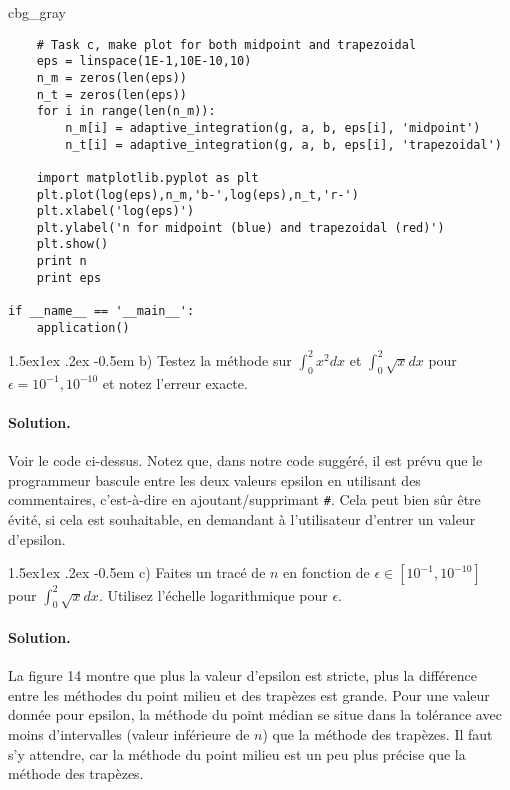 \documentclass[%
oneside,                 %
final,                   %
10pt,french]{article}
\makeatletter
\newenvironment{_cod_tight}[1]{
   \def\FrameCommand{\colorbox{#1}}
   \FrameRule0.6pt\MakeFramed {\FrameRestore}\vskip3mm}
   {\vskip0mm\endMakeFramed}
\newenvironment{cod}[1]{
\bgroup\rmfamily
\fboxsep=0mm\relax
\begin{_cod_tight}{#1}
\list{}{\parsep=-2mm\parskip=0mm\topsep=0pt\leftmargin=2mm
\rightmargin=2\leftmargin\leftmargin=4pt\relax}
\item\relax}
{\endlist\end{_cod_tight}\egroup}
\newenvironment{doconceexercise}{}{}
\newcommand\subex{\@startsection{paragraph}{4}{\z@}%
                  {1.5ex\@plus1ex \@minus.2ex}%
                  {-0.5em}%
                  {\normalfont\normalsize\bfseries}}
\makeatother
\begin{document}
\begin{doconceexercise}
\begin{cod}{cbg_gray}
\begin{verbatim}
    # Task c, make plot for both midpoint and trapezoidal
    eps = linspace(1E-1,10E-10,10)
    n_m = zeros(len(eps))
    n_t = zeros(len(eps))
    for i in range(len(n_m)):
        n_m[i] = adaptive_integration(g, a, b, eps[i], 'midpoint')
        n_t[i] = adaptive_integration(g, a, b, eps[i], 'trapezoidal')

    import matplotlib.pyplot as plt
    plt.plot(log(eps),n_m,'b-',log(eps),n_t,'r-')
    plt.xlabel('log(eps)')
    plt.ylabel('n for midpoint (blue) and trapezoidal (red)')
    plt.show()
    print n
    print eps

if __name__ == '__main__':
    application()

\end{verbatim}
\end{cod}
\noindent


\subex{b)}
Testez la méthode sur $\int_0^2x^2dx$ et $\int_0^2\sqrt{x}dx$ pour $\epsilon = 10^{−1},10^{−10}$ et notez l'erreur exacte.


\paragraph{Solution.}
Voir le code ci-dessus. Notez que, dans notre code suggéré, il est prévu que le programmeur bascule entre les deux valeurs epsilon en utilisant des commentaires, c'est-à-dire en ajoutant/supprimant \Verb!#!. Cela peut bien sûr être évité, si cela est souhaitable, en demandant à l'utilisateur d'entrer un valeur d'epsilon.


\subex{c)}
Faites un tracé de $n$ en fonction de $\epsilon \in [10^{-1}, 10^{-10}]$ pour $\int_0^2\sqrt{x}dx$. Utilisez l'échelle logarithmique pour $\epsilon$.


\paragraph{Solution.}
La figure 14 montre que plus la valeur d'epsilon est stricte, plus la différence entre les méthodes du point milieu et des trapèzes est grande. Pour une valeur donnée pour epsilon, la méthode du point médian se situe dans la tolérance avec moins d'intervalles (valeur inférieure de $n$) que la méthode des trapèzes. Il faut s'y attendre, car la méthode du point milieu est un peu plus précise que la méthode des trapèzes.


\end{doconceexercise}
\end{document}
